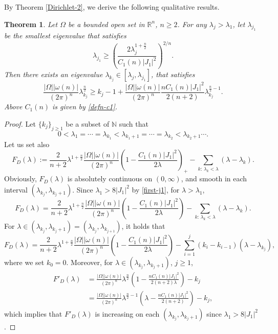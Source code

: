 \documentclass[11pt,twoside, leqno]{article}
\def\rr{{\mathbb R}}
\def\rn{{{\rr}^n}}
\newtheorem{thm}{Theorem}[section]
\numberwithin{equation}{section}
\begin{document}
By Theorem \ref{Dirichlet-2}, we derive the following qualitative results.
\begin{thm}\label{infinite-dirichlet-polya}
Let $\Omega$ be a bounded open set in $\rn$, $n\ge 2$.
For any $\lambda_{j}>\lambda_1$, let $\lambda_{j_1}$ be the smallest eigenvalue that satisfies
$$\lambda_{j_1}\ge \left(\frac{2\lambda_{j}^{1+\frac n2}}{C_1(n)|J_1|^2}\right)^{2/n}.$$
Then there exists an eigenvalue $\lambda_{k_j}\in [\lambda_{j}, \lambda_{j_1}]$, that satisfies
$$\frac{|\Omega| |\omega(n)|}{(2\pi)^{n}}  \lambda_{k_{j}}^{\frac n2}\ge k_{j}-1+\frac{|\Omega| |\omega(n)|}{(2\pi)^{n}} \frac{nC_1(n)|J_1|^2}{2(n+2)}\lambda_{k_{j}}^{\frac n2-1}. $$
Above $C_1(n)$ is given by \eqref{defn-c1}.
\end{thm}
\begin{proof}
Let $\{k_j\}_{j\ge 1}$ be a subset of $\mathbb{N}$ such that
$$0<\lambda_1=\cdots=\lambda_{k_1}<\lambda_{k_1+1}=\cdots=\lambda_{k_2}<\lambda_{k_2+1}\cdots. $$
Let us set also
$$F_D(\lambda):= \frac{2}{n+2} \lambda^{1+\frac n2} \frac{|\Omega| |\omega(n)|}{(2\pi)^{n}}\left(1 -\frac{C_1(n)|J_1|^2}{2\lambda}\right)_+-\sum_{k:\,\lambda_k<\lambda}(\lambda-\lambda_k).$$
Obviously, $F_D(\lambda)$ is absolutely continuous on $(0,\infty)$, and smooth in each interval $ (\lambda_{k_{j}},\lambda_{k_{j}+1})$.
Since $\lambda_1>8|J_1|^2$ by \eqref{first-j1}, for $\lambda>\lambda_1$,
$$F_D(\lambda)= \frac{2}{n+2} \lambda^{1+\frac n2} \frac{|\Omega| |\omega(n)|}{(2\pi)^{n}}\left(1 -\frac{C_1(n)|J_1|^2}{2\lambda}\right)-\sum_{k:\,\lambda_k<\lambda}(\lambda-\lambda_k).$$
For $\lambda\in (\lambda_{k_{j}},\lambda_{k_{j}+1})=(\lambda_{k_{j}},\lambda_{k_{j+1}})$, it holds that
$$F_D(\lambda)= \frac{2}{n+2} \lambda^{1+\frac n2} \frac{|\Omega| |\omega(n)|}{(2\pi)^{n}}\left(1 -\frac{C_1(n) |J_1|^2}{2\lambda}\right)-\sum_{i=1}^{j}(k_{i}-k_{i-1})(\lambda-\lambda_{k_{j}}),$$
where we set $k_0=0$.
Moreover, for $\lambda\in (\lambda_{k_{j}},\lambda_{k_{j}+1})$, $j\ge 1$,
\begin{align}\label{F-increasing}
F'_D(\lambda)&=\frac{|\Omega| |\omega(n)|}{(2\pi)^{n}}  \lambda^{\frac n2}\left(1 -\frac{nC_1(n)|J_1|^2}{2(n+2)\lambda }\right)-k_{j}\nonumber\\
&=\frac{|\Omega| |\omega(n)|}{(2\pi)^{n}}  \lambda^{\frac n2-1}\left(\lambda -\frac{nC_1(n)|J_1|^2}{2(n+2) }\right)-k_{j},
\end{align}
which implies that $F'_D(\lambda)$ is increasing on each $(\lambda_{k_{j}},\lambda_{k_{j}+1})$ since   $\lambda_1>8|J_1|^2$.





\end{proof}
\end{document}
